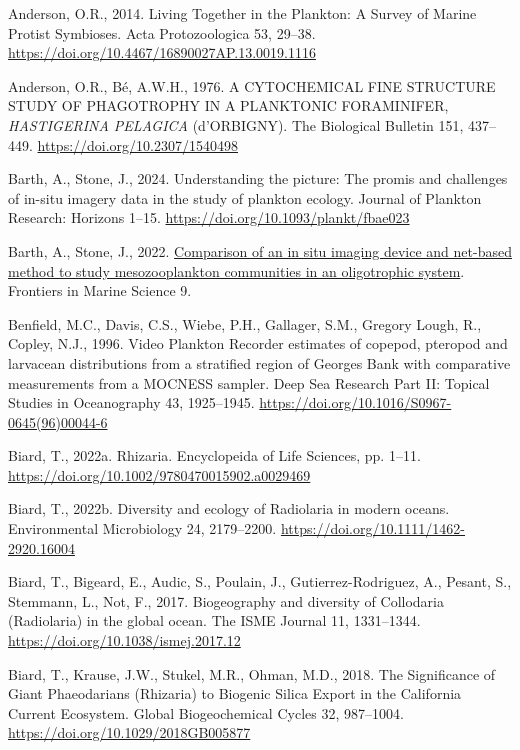\documentclass[
]{article}
\newlength{\cslhangindent}
\newenvironment{CSLReferences}[2] %
 {\begin{list}{}{%
  \setlength{\itemindent}{0pt}
  \setlength{\leftmargin}{0pt}
  \setlength{\parsep}{0pt}
  \ifodd #1
   \setlength{\leftmargin}{\cslhangindent}
   \setlength{\itemindent}{-1\cslhangindent}
  \fi
  \setlength{\itemsep}{#2\baselineskip}}}
 {\end{list}}
\begin{document}
\label{refs}
\begin{CSLReferences}{1}{0}
Anderson, O.R., 2014. Living Together in the Plankton: A Survey of
Marine Protist Symbioses. Acta Protozoologica 53, 29--38.
\url{https://doi.org/10.4467/16890027AP.13.0019.1116}

Anderson, O.R., Bé, A.W.H., 1976. A CYTOCHEMICAL FINE STRUCTURE STUDY OF
PHAGOTROPHY IN A PLANKTONIC FORAMINIFER, {\emph{HASTIGERINA PELAGICA}}
(d'ORBIGNY). The Biological Bulletin 151, 437--449.
\url{https://doi.org/10.2307/1540498}

Barth, A., Stone, J., 2024. Understanding the picture: The promis and
challenges of in-situ imagery data in the study of plankton ecology.
Journal of Plankton Research: Horizons 1--15.
\url{https://doi.org/10.1093/plankt/fbae023}

Barth, A., Stone, J., 2022.
\href{https://www.frontiersin.org/articles/10.3389/fmars.2022.898057}{Comparison
of an in situ imaging device and net-based method to study
mesozooplankton communities in an oligotrophic system}. Frontiers in
Marine Science 9.

Benfield, M.C., Davis, C.S., Wiebe, P.H., Gallager, S.M., Gregory Lough,
R., Copley, N.J., 1996. Video Plankton Recorder estimates of copepod,
pteropod and larvacean distributions from a stratified region of Georges
Bank with comparative measurements from a MOCNESS sampler. Deep Sea
Research Part II: Topical Studies in Oceanography 43, 1925--1945.
\url{https://doi.org/10.1016/S0967-0645(96)00044-6}

Biard, T., 2022a. Rhizaria. Encyclopeida of Life Sciences, pp. 1--11.
\url{https://doi.org/10.1002/9780470015902.a0029469}

Biard, T., 2022b. Diversity and ecology of Radiolaria in modern oceans.
Environmental Microbiology 24, 2179--2200.
\url{https://doi.org/10.1111/1462-2920.16004}

Biard, T., Bigeard, E., Audic, S., Poulain, J., Gutierrez-Rodriguez, A.,
Pesant, S., Stemmann, L., Not, F., 2017. Biogeography and diversity of
Collodaria (Radiolaria) in the global ocean. The ISME Journal 11,
1331--1344. \url{https://doi.org/10.1038/ismej.2017.12}

Biard, T., Krause, J.W., Stukel, M.R., Ohman, M.D., 2018. The
Significance of Giant Phaeodarians (Rhizaria) to Biogenic Silica Export
in the California Current Ecosystem. Global Biogeochemical Cycles 32,
987--1004. \url{https://doi.org/10.1029/2018GB005877}


\end{CSLReferences}
\end{document}

